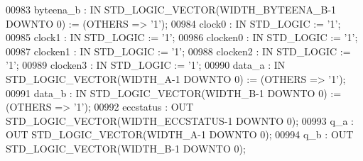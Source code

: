 \begin{DoxyCode}
{00983         byteena\_b   :   \textcolor{keywordflow}{IN} \textcolor{comment}{STD\_LOGIC\_VECTOR}(WIDTH\_BYTEENA\_B\textcolor{vhdlchar}{-}\textcolor{vhdllogic}{}\textcolor{vhdllogic}{1} \textcolor{keywordflow}{DOWNTO} \textcolor{vhdllogic}{}\textcolor{vhdllogic}{0}) := (\textcolor{keywordflow}{OTHERS} => '\textcolor{vhdllogic}{}\textcolor{vhdllogic}{1}');
00984         clock0  :   \textcolor{keywordflow}{IN} \textcolor{comment}{STD\_LOGIC} := '\textcolor{vhdllogic}{}\textcolor{vhdllogic}{1}';
00985         clock1  :   \textcolor{keywordflow}{IN} \textcolor{comment}{STD\_LOGIC} := '\textcolor{vhdllogic}{}\textcolor{vhdllogic}{1}';
00986         clocken0    :   \textcolor{keywordflow}{IN} \textcolor{comment}{STD\_LOGIC} := '\textcolor{vhdllogic}{}\textcolor{vhdllogic}{1}';
00987         clocken1    :   \textcolor{keywordflow}{IN} \textcolor{comment}{STD\_LOGIC} := '\textcolor{vhdllogic}{}\textcolor{vhdllogic}{1}';
00988         clocken2    :   \textcolor{keywordflow}{IN} \textcolor{comment}{STD\_LOGIC} := '\textcolor{vhdllogic}{}\textcolor{vhdllogic}{1}';
00989         clocken3    :   \textcolor{keywordflow}{IN} \textcolor{comment}{STD\_LOGIC} := '\textcolor{vhdllogic}{}\textcolor{vhdllogic}{1}';
00990         data\_a  :   \textcolor{keywordflow}{IN} \textcolor{comment}{STD\_LOGIC\_VECTOR}(WIDTH\_A\textcolor{vhdlchar}{-}\textcolor{vhdllogic}{}\textcolor{vhdllogic}{1} \textcolor{keywordflow}{DOWNTO} \textcolor{vhdllogic}{}\textcolor{vhdllogic}{0}) := (\textcolor{keywordflow}{OTHERS} => '\textcolor{vhdllogic}{}\textcolor{vhdllogic}{1}');
00991         data\_b  :   \textcolor{keywordflow}{IN} \textcolor{comment}{STD\_LOGIC\_VECTOR}(WIDTH\_B\textcolor{vhdlchar}{-}\textcolor{vhdllogic}{}\textcolor{vhdllogic}{1} \textcolor{keywordflow}{DOWNTO} \textcolor{vhdllogic}{}\textcolor{vhdllogic}{0}) := (\textcolor{keywordflow}{OTHERS} => '\textcolor{vhdllogic}{}\textcolor{vhdllogic}{1}');
00992         eccstatus   :   \textcolor{keywordflow}{OUT} \textcolor{comment}{STD\_LOGIC\_VECTOR}(WIDTH\_ECCSTATUS\textcolor{vhdlchar}{-}\textcolor{vhdllogic}{}\textcolor{vhdllogic}{1} \textcolor{keywordflow}{DOWNTO} \textcolor{vhdllogic}{}\textcolor{vhdllogic}{0});
00993         q\_a :   \textcolor{keywordflow}{OUT} \textcolor{comment}{STD\_LOGIC\_VECTOR}(WIDTH\_A\textcolor{vhdlchar}{-}\textcolor{vhdllogic}{}\textcolor{vhdllogic}{1} \textcolor{keywordflow}{DOWNTO} \textcolor{vhdllogic}{}\textcolor{vhdllogic}{0});
00994         q\_b :   \textcolor{keywordflow}{OUT} \textcolor{comment}{STD\_LOGIC\_VECTOR}(WIDTH\_B\textcolor{vhdlchar}{-}\textcolor{vhdllogic}{}\textcolor{vhdllogic}{1} \textcolor{keywordflow}{DOWNTO} \textcolor{vhdllogic}{}\textcolor{vhdllogic}{0});
}
\end{DoxyCode}
